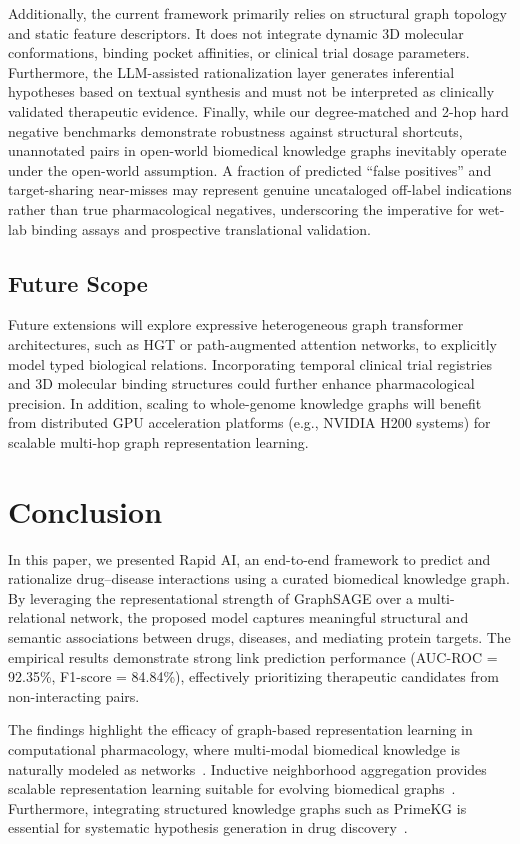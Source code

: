 \documentclass[conference,a4paper]{IEEEtran}
\begin{document}
Additionally, the current framework primarily relies on structural graph topology and static feature descriptors. It does not integrate dynamic 3D molecular conformations, binding pocket affinities, or clinical trial dosage parameters. Furthermore, the LLM-assisted rationalization layer generates inferential hypotheses based on textual synthesis and must not be interpreted as clinically validated therapeutic evidence. Finally, while our degree-matched and 2-hop hard negative benchmarks demonstrate robustness against structural shortcuts, unannotated pairs in open-world biomedical knowledge graphs inevitably operate under the open-world assumption. A fraction of predicted ``false positives'' and target-sharing near-misses may represent genuine uncataloged off-label indications rather than true pharmacological negatives, underscoring the imperative for wet-lab binding assays and prospective translational validation.

\subsection{Future Scope}
Future extensions will explore expressive heterogeneous graph transformer architectures, such as HGT or path-augmented attention networks, to explicitly model typed biological relations. Incorporating temporal clinical trial registries and 3D molecular binding structures could further enhance pharmacological precision. In addition, scaling to whole-genome knowledge graphs will benefit from distributed GPU acceleration platforms (e.g., NVIDIA H200 systems) for scalable multi-hop graph representation learning.

\section{Conclusion}
In this paper, we presented Rapid AI, an end-to-end framework to predict and rationalize drug--disease interactions using a curated biomedical knowledge graph. By leveraging the representational strength of GraphSAGE over a multi-relational network, the proposed model captures meaningful structural and semantic associations between drugs, diseases, and mediating protein targets. The empirical results demonstrate strong link prediction performance (AUC-ROC = 92.35\%, F1-score = 84.84\%), effectively prioritizing therapeutic candidates from non-interacting pairs.

The findings highlight the efficacy of graph-based representation learning in computational pharmacology, where multi-modal biomedical knowledge is naturally modeled as networks~\cite{ref3,ref4}. Inductive neighborhood aggregation provides scalable representation learning suitable for evolving biomedical graphs~\cite{ref1}. Furthermore, integrating structured knowledge graphs such as PrimeKG is essential for systematic hypothesis generation in drug discovery~\cite{ref6,ref7,ref29}.
\end{document}
